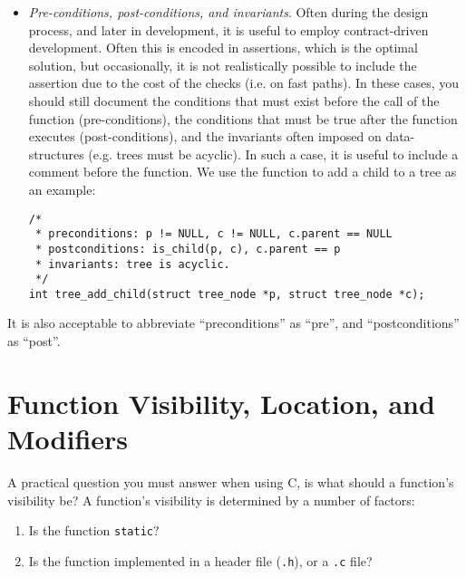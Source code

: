 \documentclass[11pt,onecolumn]{article}
\begin{document}
\begin{itemize}[itemsep=0pt,topsep=1pt,parsep=1pt,leftmargin=2.5em]
\item {\em Pre-conditions, post-conditions, and invariants}.  Often
  during the design process, and later in development, it is useful to
  employ contract-driven development.  Often this is encoded in
  assertions, which is the optimal solution, but occasionally, it is
  not realistically possible to include the assertion due to the cost
  of the checks (i.e. on fast paths).  In these cases, you should
  still document the conditions that must exist before the call of the
  function (pre-conditions), the conditions that must be true after
  the function executes (post-conditions), and the invariants often
  imposed on data-structures (e.g. trees must be acyclic).  In such a
  case, it is useful to include a comment before the function.  We use
  the function to add a child to a tree as an example:
    \begin{minipage}{3in}
      \footnotesize
      \lstset{language=C}
      \begin{lstlisting}
/*
 * preconditions: p != NULL, c != NULL, c.parent == NULL
 * postconditions: is_child(p, c), c.parent == p
 * invariants: tree is acyclic.
 */
int tree_add_child(struct tree_node *p, struct tree_node *c);
      \end{lstlisting}
    \end{minipage}
\end{itemize}

  It is also acceptable to abbreviate ``preconditions'' as ``pre'',
  and ``postconditions'' as ``post''.

\section{Function Visibility, Location, and Modifiers}
\label{s:visibility}

A practical question you must answer when using C, is what should a
function's visibility be?  A function's visibility is determined by a
number of factors:
\begin{enumerate}[itemsep=0pt,topsep=1pt,parsep=1pt,leftmargin=2.5em]
\item Is the function {\tt static}?
\item Is the function implemented in a header file ({\tt *.h}), or a
  {\tt *.c} file?
\end{enumerate}
\end{document}
